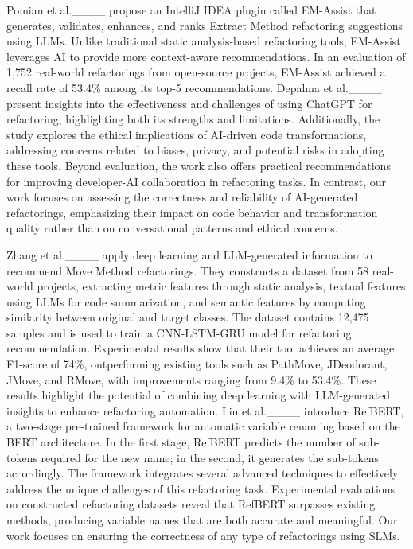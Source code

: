 Pomian et al.____ propose an IntelliJ IDEA plugin called EM-Assist that generates, validates, enhances, and ranks Extract Method refactoring suggestions using LLMs. Unlike traditional static analysis-based refactoring tools, EM-Assist leverages AI to provide more context-aware recommendations. In an evaluation of 1,752 real-world refactorings from open-source projects, EM-Assist achieved a recall rate of 53.4\% among its top-5 recommendations. 
Depalma et al.____ present insights into the effectiveness and challenges of using ChatGPT for refactoring, highlighting both its strengths and limitations. Additionally, the study explores the ethical implications of AI-driven code transformations, addressing concerns related to biases, privacy, and potential risks in adopting these tools. Beyond evaluation, the work also offers practical recommendations for improving developer-AI collaboration in refactoring tasks. 
In contrast, our work focuses on assessing the correctness and reliability of AI-generated refactorings, emphasizing their impact on code behavior and transformation quality rather than on conversational patterns and ethical concerns.

Zhang et al.____ apply deep learning and LLM-generated information to recommend Move Method refactorings. They constructs a dataset from 58 real-world projects, extracting metric features through static analysis, textual features using LLMs for code summarization, and semantic features by computing similarity between original and target classes. The dataset contains 12,475 samples and is used to train a CNN-LSTM-GRU model for refactoring recommendation. Experimental results show that their tool achieves an average F1-score of 74\%, outperforming existing tools such as PathMove, JDeodorant, JMove, and RMove, with improvements ranging from 9.4\% to 53.4\%. These results highlight the potential of combining deep learning with LLM-generated insights to enhance refactoring automation. 
Liu et al.____ introduce RefBERT, a two-stage pre-trained framework for automatic variable renaming based on the BERT architecture. In the first stage, RefBERT predicts the number of sub-tokens required for the new name; in the second, it generates the sub-tokens accordingly. The framework integrates several advanced techniques to effectively address the unique challenges of this refactoring task. Experimental evaluations on constructed refactoring datasets reveal that RefBERT surpasses existing methods, producing variable names that are both accurate and meaningful.
Our work focuses on ensuring the correctness of any type of refactorings using SLMs.

